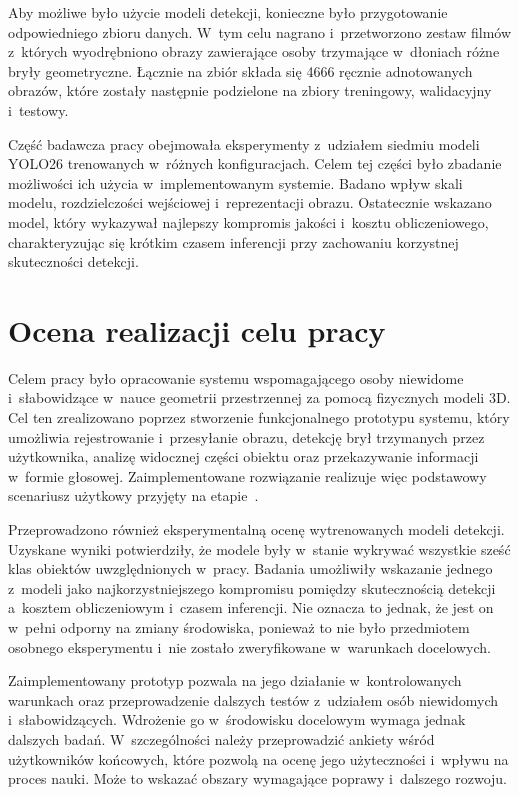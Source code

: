 Aby możliwe było użycie modeli detekcji, konieczne było przygotowanie odpowiedniego zbioru danych. W~tym celu nagrano i~przetworzono zestaw filmów z~których wyodrębniono obrazy zawierające osoby trzymające w~dłoniach różne bryły geometryczne. Łącznie na zbiór składa się 4666 ręcznie adnotowanych obrazów, które zostały następnie podzielone na zbiory treningowy, walidacyjny i~testowy.

Część badawcza pracy obejmowała eksperymenty z~udziałem siedmiu modeli YOLO26 trenowanych w~różnych konfiguracjach. Celem tej części było zbadanie możliwości ich użycia w~implementowanym systemie. Badano wpływ skali modelu, rozdzielczości wejściowej i~reprezentacji obrazu. Ostatecznie wskazano model, który wykazywał najlepszy kompromis jakości i~kosztu obliczeniowego, charakteryzując się krótkim czasem inferencji przy zachowaniu korzystnej skuteczności detekcji.

\section{Ocena realizacji celu pracy}

Celem pracy było opracowanie systemu wspomagającego osoby niewidome i~słabowidzące w~nauce geometrii przestrzennej za pomocą fizycznych modeli 3D. Cel ten zrealizowano poprzez stworzenie funkcjonalnego prototypu systemu, który umożliwia rejestrowanie i~przesyłanie obrazu, detekcję brył trzymanych przez użytkownika, analizę widocznej części obiektu oraz przekazywanie informacji w~formie głosowej. Zaimplementowane rozwiązanie realizuje więc podstawowy scenariusz użytkowy przyjęty na etapie~.

Przeprowadzono również eksperymentalną ocenę wytrenowanych modeli detekcji. Uzyskane wyniki potwierdziły, że modele były w~stanie wykrywać wszystkie sześć klas obiektów uwzględnionych w~pracy. Badania umożliwiły wskazanie jednego z~modeli jako najkorzystniejszego kompromisu pomiędzy skutecznością detekcji a~kosztem obliczeniowym i~czasem inferencji. Nie oznacza to jednak, że jest on w~pełni odporny na zmiany środowiska, ponieważ to nie było przedmiotem osobnego eksperymentu i~nie zostało zweryfikowane w~warunkach docelowych.

Zaimplementowany prototyp pozwala na jego działanie w~kontrolowanych warunkach oraz przeprowadzenie dalszych testów z~udziałem osób niewidomych i~słabowidzących. Wdrożenie go w~środowisku docelowym wymaga jednak dalszych badań. W~szczególności należy przeprowadzić ankiety wśród użytkowników końcowych, które pozwolą na ocenę jego użyteczności i~wpływu na proces nauki. Może to wskazać obszary wymagające poprawy i~dalszego rozwoju.

